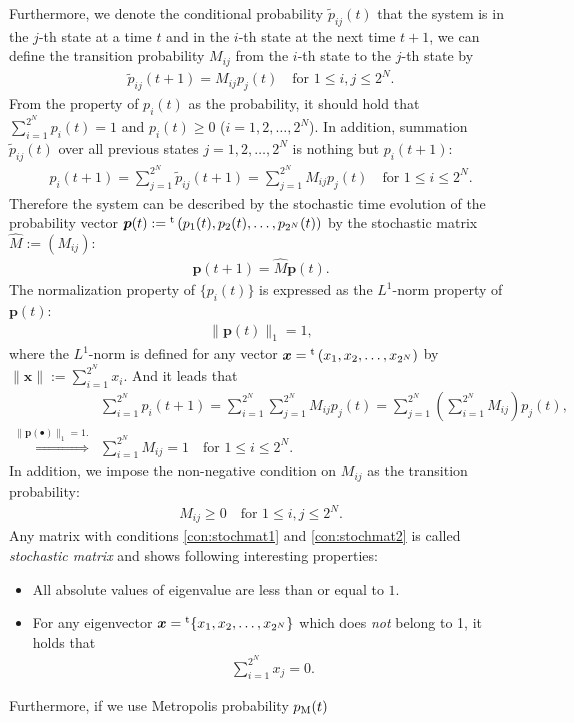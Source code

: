 Furthermore, we denote the conditional probability $\tilde{p}_{ij}(t)$ that the system is in the $j$-th state at a time $t$ and in the $i$-th state at the next time $t+1$, we can define the transition probability $M_{ij}$ from the $i$-th state to the $j$-th state by
\begin{align}
\tilde{p}_{ij}(t + 1) = M_{ij} p_{j}(t)\quad\text{for $1\leq i,j\leq 2^{N}$}.
\end{align}
From the property of $p_{i}(t)$ as the probability, it should hold that $\sum_{i=1}^{2^{N}}p_{i}(t)=1$ and $p_{i}(t) \ge 0$ ($i=1,2,\dots,2^{N}$). In addition, summation $\tilde{p}_{ij}(t)$ over all previous states $j=1,2,\dots,2^{N}$ is nothing but $p_{i}(t+1)$:
\begin{align}
p_{i}(t+1) = \sum_{j=1}^{2^{N}}\tilde{p}_{ij}(t + 1) = \sum_{j=1}^{2^{N}}M_{ij}p_{j}(t)\quad\text{for $1\leq i\leq 2^{N}$}.
\end{align}
Therefore the system can be described by the stochastic time evolution of the probability vector $\bm{p}(t):={}^{\rm t}\left(p_{1}(t),p_{2}(t),\dots,p_{2^{N}}(t)\right)$ by the stochastic matrix $\hat{M}:=\left(M_{ij}\right)$:
\begin{align}
\bm{p}(t + 1) = \hat{M}\bm{p}(t).
\end{align}
The normalization property of $\{p_{i}(t)\}$ is expressed as the $L^{1}$-norm property of $\bm{p}(t)$:
\begin{align}
\|\bm{p}(t)\|_{1} = 1,
\end{align}
where the $L^{1}$-norm is defined for any vector $\bm{x}={}^{\rm t}\left(x_{1},x_{2},\dots,x_{2^{N}}\right)$ by $\|\bm{x}\|:=\sum_{i=1}^{2^{N}}x_{i}$. And it leads that
\begin{align}
&\sum_{i=1}^{2^{N}}p_{i}(t + 1) = \sum_{i=1}^{2^{N}}\sum_{j=1}^{2^{N}}M_{ij}p_{j}(t) = \sum_{j=1}^{2^{N}} \left(\sum_{i=1}^{2^{N}}M_{ij}\right)p_{j}(t),\\
\overset{\|\bm{p}(\bullet)\|_{1} = 1.}{\Longleftrightarrow} &\sum_{i=1}^{2^{N}}M_{ij} = 1\quad\text{for $1\leq i\leq 2^{N}$}\label{con:stochmat1}.
\end{align}
In addition, we impose the non-negative condition on $M_{ij}$ as the transition probability:
\begin{align}
M_{ij}\ge 0\quad\text{for $1\leq i,j\leq 2^{N}$}\label{con:stochmat2}.
\end{align}
Any matrix with conditions \eqref{con:stochmat1} and \eqref{con:stochmat2} is called \textit{stochastic matrix} and shows following interesting properties:
\begin{itemize}
	\item All absolute values of eigenvalue are less than or equal to $1$.
	\item For any eigenvector $\bm{x}={}^{\rm t}\{x_{1},x_{2},\dots,x_{2^{N}}\}$ which does \textit{not} belong to 1, it holds that
	\begin{align}
		\sum_{i=1}^{2^{N}}x_{j}=0.
	\end{align}
\end{itemize}
Furthermore, if we use Metropolis probability $p_{\rm M}(t)$


